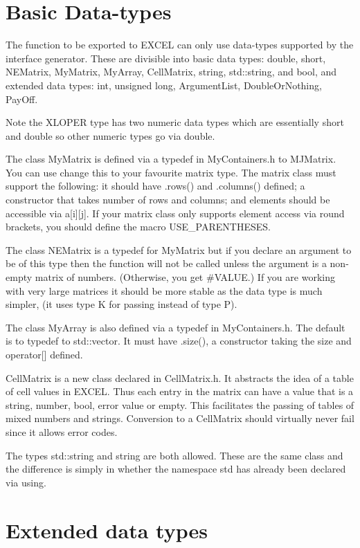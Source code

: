 \documentclass[12pt,reqno]{amsart}
\numberwithin{equation}{section}
\numberwithin{figure}{section}
\begin{document}
\section{Basic Data-types}

The function to be exported to EXCEL can only use data-types supported by the
interface generator. These are divisible into basic data types: double, short,
NEMatrix, MyMatrix, MyArray, CellMatrix, string, std::string, and bool, and
extended data types: int, unsigned long, ArgumentList, DoubleOrNothing, PayOff. 

Note the XLOPER type has two numeric data types which are essentially
short and double so other numeric types go via double. 

The class MyMatrix is defined via a typedef in MyContainers.h to
MJMatrix. You can use change this to your favourite matrix type. The
matrix class must support the following: it should have .rows()
and .columns() defined; a constructor that takes number of rows and
columns; and elements should be accessible via a[i][j]. If your matrix
class only supports element access via round brackets, you should
define the macro USE\_PARENTHESES.

The class NEMatrix is a typedef for MyMatrix but if you declare an
argument to be of this type then the function will not be called
unless the argument is a non-empty matrix of numbers. (Otherwise, you
get \#VALUE.) If you are working with very large matrices it should be
more stable as the data type is much simpler, (it uses type K for
passing instead of type P). 

The class MyArray is also defined via a typedef in MyContainers.h. The
default is to typedef to std::vector. It must have .size(), a
constructor taking the size and operator[] defined. 

CellMatrix is a new class declared in CellMatrix.h. It abstracts the
idea of a table of cell values in EXCEL. Thus each entry in the matrix
can have a value that is a string, number, bool, error value or
empty. This facilitates the passing of tables of mixed numbers and
strings. Conversion to a CellMatrix should virtually never fail since
it allows error codes. 

The types std::string and string are both allowed. These are the same
class and the difference is simply in whether the namespace std has
already been declared via using. 

\section{Extended data types}
\end{document}

